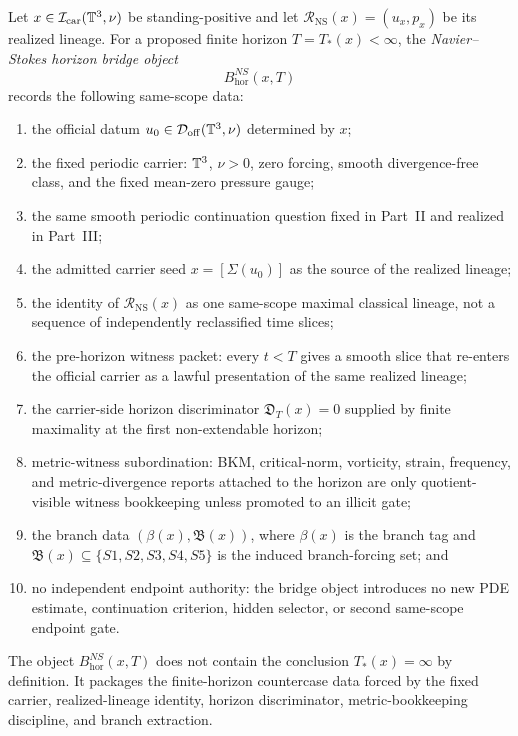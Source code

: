 \begin{manualdefinition}
\label{def:ns-horizon-bridge-object}
Let $x\in\mathcal I_{\mathrm{car}}(\mathbb{T}^3,\nu)$ be standing-positive and let
$\mathcal R_{\mathrm{NS}}(x)=(u_x,p_x)$ be its realized lineage. For a proposed finite horizon $T=T_*(x)<\infty$, the \emph{Navier--Stokes horizon bridge object}
\[
B^{NS}_{\mathrm{hor}}(x,T)
\]
records the following same-scope data:
\begin{enumerate}[label=\textbf{B\arabic*.}, leftmargin=3.2em, itemsep=0.15em]
\item the official datum $u_0\in\mathcal D_{\mathrm{off}}(\mathbb{T}^3,\nu)$ determined by $x$;
\item the fixed periodic carrier: $\mathbb{T}^3$, $\nu>0$, zero forcing, smooth divergence-free class, and the fixed mean-zero pressure gauge;
\item the same smooth periodic continuation question fixed in Part~II and realized in Part~III;
\item the admitted carrier seed $x=[\Sigma(u_0)]$ as the source of the realized lineage;
\item the identity of $\mathcal R_{\mathrm{NS}}(x)$ as one same-scope maximal classical lineage, not a sequence of independently reclassified time slices;
\item the pre-horizon witness packet: every $t<T$ gives a smooth slice that re-enters the official carrier as a lawful presentation of the same realized lineage;
\item the carrier-side horizon discriminator $\mathfrak D_T(x)=0$ supplied by finite maximality at the first non-extendable horizon;
\item metric-witness subordination: BKM, critical-norm, vorticity, strain, frequency, and metric-divergence reports attached to the horizon are only quotient-visible witness bookkeeping unless promoted to an illicit gate;
\item the branch data $(\beta(x),\mathfrak B(x))$, where $\beta(x)$ is the branch tag and $\mathfrak B(x)\subseteq\{S1,S2,S3,S4,S5\}$ is the induced branch-forcing set; and
\item no independent endpoint authority: the bridge object introduces no new PDE estimate, continuation criterion, hidden selector, or second same-scope endpoint gate.
\end{enumerate}
\end{manualdefinition}

\begin{manualproposition}
\label{prop:ns-horizon-bridge-noncircular}
The object $B^{NS}_{\mathrm{hor}}(x,T)$ does not contain the conclusion $T_*(x)=\infty$ by definition. It packages the finite-horizon countercase data forced by the fixed carrier, realized-lineage identity, horizon discriminator, metric-bookkeeping discipline, and branch extraction.
\end{manualproposition}

